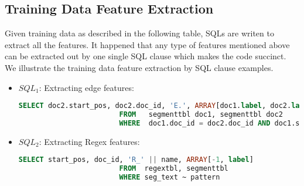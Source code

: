 \subsection{Training Data Feature Extraction}
Given training data as described in the following table, SQLs are writen to extract all the features. It happened that any type of features mentioned above can be extracted out by one single SQL clause which makes the code succinct. We illustrate the training data feature extraction by SQL clause examples.
\begin{itemize}
\item $SQL_1$: Extracting edge features:\\
              \begin{lstlisting}[language=SQL,gobble=4]
                        SELECT doc2.start_pos, doc2.doc_id, 'E.', ARRAY[doc1.label, doc2.label]
                        FROM   segmenttbl doc1, segmenttbl doc2
                        WHERE  doc1.doc_id = doc2.doc_id AND doc1.start_pos+1 = doc2.start_pos
              \end{lstlisting}

\item $SQL_2$: Extracting Regex features:\\
              \begin{lstlisting}[language=SQL,gobble=4]
                        SELECT start_pos, doc_id, 'R_' || name, ARRAY[-1, label]
                        FROM  regextbl, segmenttbl
                        WHERE seg_text ~ pattern
              \end{lstlisting}

        

\end{itemize}
